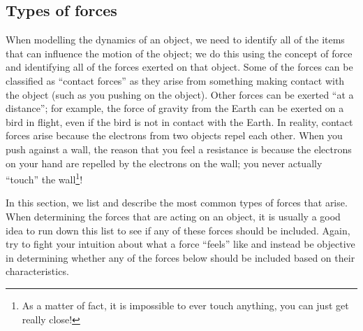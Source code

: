 \subsection{Types of forces}
\label{sec:newtonslaws:typesofforces}
When modelling the dynamics of an object, we need to identify all of the items that can influence the motion of the object; we do this using the concept of force and identifying all of the forces exerted on that object. Some of the forces can be classified as ``contact forces'' as they arise from something making contact with the object (such as you pushing on the object). Other forces can be exerted ``at a distance''; for example, the force of gravity from the Earth can be exerted on a bird in flight, even if the bird is not in contact with the Earth. In reality, contact forces arise because the electrons from two objects repel each other. When you push against a wall, the reason that you feel a resistance is because the electrons on your hand are repelled by the electrons on the wall; you never actually ``touch'' the wall\footnote{As a matter of fact, it is impossible to ever touch anything, you can just get really close!}!

In this section, we list and describe the most common types of forces that arise. When determining the forces that are acting on an object, it is usually a good idea to run down this list to see if any of these forces should be included. Again, try to fight your intuition about what a force ``feels'' like and instead be objective in determining whether any of the forces below should be included based on their characteristics.

